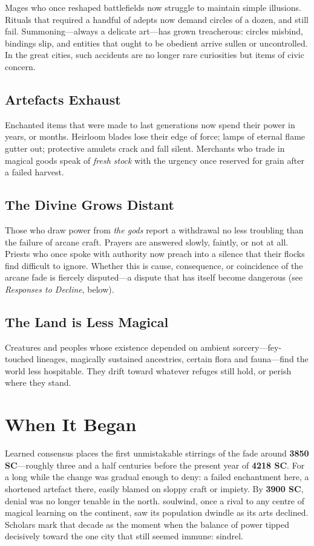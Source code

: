 Mages who once reshaped battlefields now struggle to maintain simple illusions. Rituals that required a handful of adepts now demand circles of a dozen, and still fail. Summoning---always a delicate art---has grown treacherous: circles misbind, bindings slip, and entities that ought to be obedient arrive sullen or uncontrolled. In the great cities, such accidents are no longer rare curiosities but items of civic concern.

\subsection{Artefacts Exhaust}

Enchanted items that were made to last generations now spend their power in years, or months. Heirloom blades lose their edge of force; lamps of eternal flame gutter out; protective amulets crack and fall silent. Merchants who trade in magical goods speak of \emph{fresh stock} with the urgency once reserved for grain after a failed harvest.

\subsection{The Divine Grows Distant}

Those who draw power from \emph{the gods} report a withdrawal no less troubling than the failure of arcane craft. Prayers are answered slowly, faintly, or not at all. Priests who once spoke with authority now preach into a silence that their flocks find difficult to ignore. Whether this is cause, consequence, or coincidence of the arcane fade is fiercely disputed---a dispute that has itself become dangerous (see \emph{Responses to Decline}, below).

\subsection{The Land is Less Magical}

Creatures and peoples whose existence depended on ambient sorcery---fey-touched lineages, magically sustained ancestries, certain flora and fauna---find the world less hospitable. They drift toward whatever refuges still hold, or perish where they stand.

\section{When It Began}

Learned consensus places the first unmistakable stirrings of the fade around \textbf{3850 SC}---roughly three and a half centuries before the present year of \textbf{4218 SC}. For a long while the change was gradual enough to deny: a failed enchantment here, a shortened artefact there, easily blamed on sloppy craft or impiety. By \textbf{3900 SC}, denial was no longer tenable in the north. \gls{soulwind}, once a rival to any centre of magical learning on the continent, saw its population dwindle as its arts declined. Scholars mark that decade as the moment when the balance of power tipped decisively toward the one city that still seemed immune: \gls{sindrel}.

